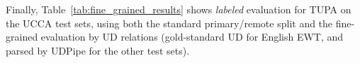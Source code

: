\documentclass[11pt,a4paper]{article}
\begin{document}
Finally, Table~\ref{tab:fine_grained_results} shows \textit{labeled} evaluation for TUPA
on the UCCA test sets,
using both the standard primary/remote split and the fine-grained evaluation by UD relations
(gold-standard UD for English EWT, and parsed by UDPipe for the other test sets).

\end{document}
